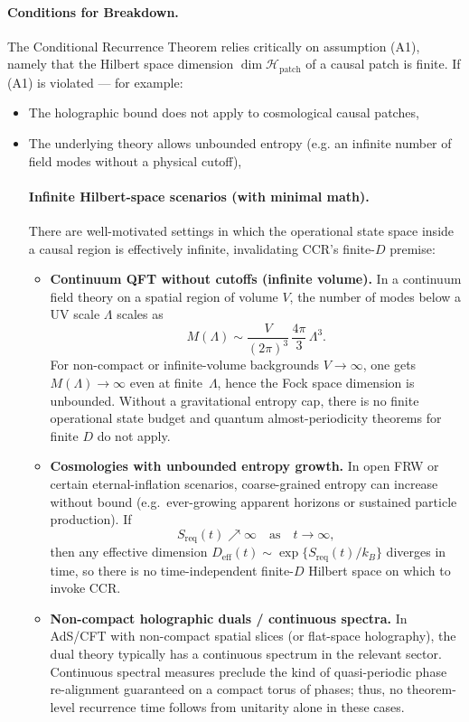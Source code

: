 \documentclass[12pt]{article}
\theoremstyle{remark}
\begin{document}
\paragraph{Conditions for Breakdown.}
The Conditional Recurrence Theorem relies critically on assumption (A1), namely that the Hilbert space dimension
$\dim\mathcal{H}_{\mathrm{patch}}$ of a causal patch is finite.
If (A1) is violated — for example:
\begin{itemize}
    \item The holographic bound does not apply to cosmological causal patches,
    \item The underlying theory allows unbounded entropy (e.g. an infinite number of field modes without a physical cutoff),

    \paragraph{Infinite Hilbert-space scenarios (with minimal math).}
There are well-motivated settings in which the operational state space inside a causal region
is effectively infinite, invalidating CCR's finite-$D$ premise:

\begin{itemize}
    \item \textbf{Continuum QFT without cutoffs (infinite volume).}
    In a continuum field theory on a spatial region of volume $V$, the number of modes below a UV scale $\Lambda$
    scales as
    \[
      M(\Lambda) \sim \frac{V}{(2\pi)^3}\,\frac{4\pi}{3}\,\Lambda^3.
    \]
    For non-compact or infinite-volume backgrounds $V\to\infty$, one gets $M(\Lambda)\to\infty$ even at finite~$\Lambda$,
    hence the Fock space dimension is unbounded. Without a gravitational entropy cap, there is no finite
    operational state budget and quantum almost-periodicity theorems for finite $D$ do not apply.

    \item \textbf{Cosmologies with unbounded entropy growth.}
    In open FRW or certain eternal-inflation scenarios, coarse-grained entropy can increase without bound
    (e.g.\ ever-growing apparent horizons or sustained particle production). If
    \[
       S_{\text{req}}(t)\nearrow\infty\quad\text{as}\quad t\to\infty,
    \]
    then any effective dimension $D_{\mathrm{eff}}(t)\sim \exp\{S_{\text{req}}(t)/k_B\}$ diverges in time, so there is
    no time-independent finite-$D$ Hilbert space on which to invoke CCR.

    \item \textbf{Non-compact holographic duals / continuous spectra.}
    In AdS/CFT with non-compact spatial slices (or flat-space holography), the dual theory typically has
    a continuous spectrum in the relevant sector. Continuous spectral measures preclude the kind of
    quasi-periodic phase re-alignment guaranteed on a compact torus of phases; thus, no theorem-level
    recurrence time follows from unitarity alone in these cases.
\end{itemize}


\end{itemize}
\end{document}
